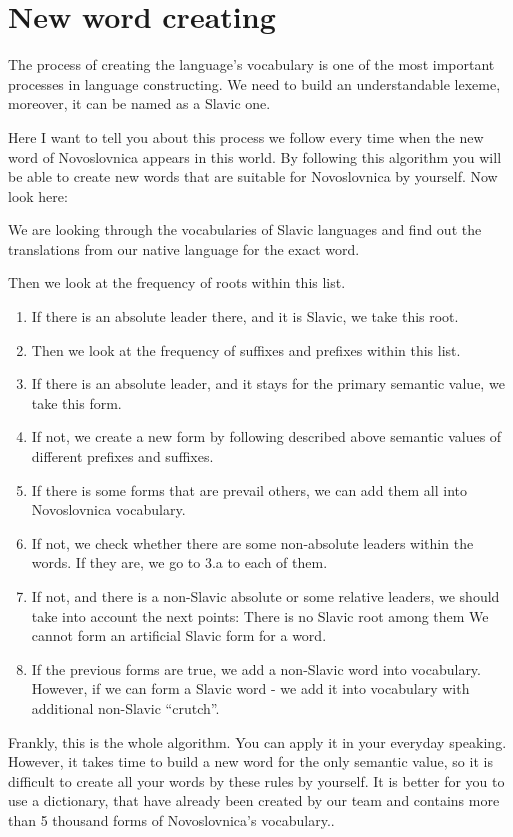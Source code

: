 \section{New word creating}

The process of creating the language’s vocabulary is one of the most important processes in language constructing. We need to build an understandable lexeme, moreover, it can be named as a Slavic one. 

Here I want to tell you about this process we follow every time when the new word of Novoslovnica appears in this world. By following this algorithm you will be able to create new words that are suitable for Novoslovnica by yourself. Now look here:

We are looking through the vocabularies of Slavic languages and find out the translations from our native language for the exact word.

Then we look at the frequency of roots within this list.

\begin{enumerate}
	\item If there is an absolute leader there, and it is Slavic, we take this root.
	\item Then we look at the frequency of suffixes and prefixes within this list.
	\item If there is an absolute leader, and it stays for the primary semantic value, we take this form.
	\item If not, we create a new form by following described above semantic values of different prefixes and suffixes.
	\item If there is some forms that are prevail others, we can add them all into Novoslovnica vocabulary.
	\item If not, we check whether there are some non-absolute leaders within the words. If they are, we go to 3.a to each of them.
	\item If not, and there is a non-Slavic absolute or some relative leaders, we should take into account the next points:
	\subitem There is no Slavic root among them
	\subitem We cannot form an artificial Slavic form for a word.
	\item If the previous forms are true, we add a non-Slavic word into vocabulary. However, if we can form a Slavic word - we add it into vocabulary with additional non-Slavic “crutch”. 
\end{enumerate}

Frankly, this is the whole algorithm. You can apply it in your everyday speaking. However, it takes time to build a new word for the only semantic value, so it is difficult to create all your words by these rules by yourself. It is better for you to use a dictionary, that have already been created by our team and contains more than 5 thousand forms of Novoslovnica’s vocabulary.. 